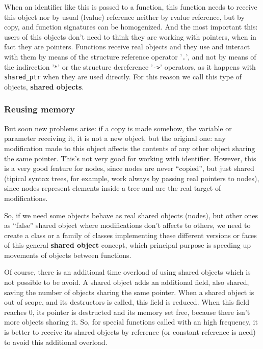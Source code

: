 \documentclass{article}
\begin{document}
When an identifier like this is passed to a function, this function needs to
receive this object nor by usual (lvalue) reference neither by rvalue reference,
but by copy, and function signatures can be homogenized. And the most important
this: users of this objects don't need to think they are working with pointers,
when in fact they are pointers. Functions receive real objects and they use and
interact with them by means of the structure reference operator '\texttt{.}',
and not by means of the indirection '\texttt{*}' or the structure dereference
'\texttt{->}' operators, as it happens with \texttt{shared\_ptr} when they are
used directly. For this reason we call this type of objects, \textbf{shared
  objects}.

\subsubsection{Reusing memory}
But soon new problems arise: if a copy is made somehow, the variable or
parameter receiving it, it is not a new object, but the original one: any
modification made to this object affects the contents of any other object
sharing the same pointer. This's not very good for working with
identifier. However, this is a very good feature for nodes, since nodes are
never ``copied'', but just shared (tipical syntax trees, for example, work
always by passing real pointers to nodes), since nodes represent elements inside
a tree and are the real target of modifications.

So, if we need some objects behave as real shared objects (nodes), but other
ones as ``false'' shared object where modifications don't affects to others, we
need to create a class or a family of classes implementing these different
versions or faces of this general \textbf{shared object} concept, which
principal purpose is speeding up movements of objects between functions.

Of course, there is an additional time overload of using shared objects which is
not possible to be avoid. A shared object adds an additional field, also shared,
saving the number of objects sharing the same pointer. When a shared object is
out of scope, and its destructors is called, this field is reduced. When this
field reaches 0, its pointer is destructed and its memory set free, because
there isn't more objects sharing it. So, for special functions called with
an high frequency, it is better to receive its shared objects by reference (or
constant reference is need) to avoid this additional overload.
\end{document}
